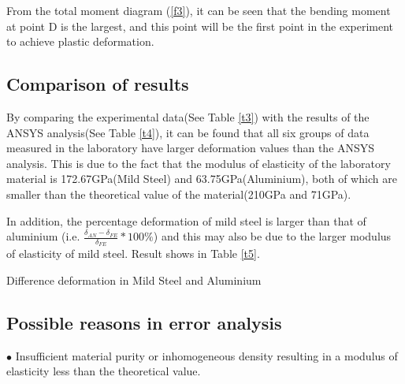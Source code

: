 From the total moment diagram (\autoref{f3}), it can be seen that the bending moment at point D is the largest, and this point will be the first point in the experiment to achieve plastic deformation.






\iffalse
\subsection*{Comparison of results}

By comparing the experimental data(See Table \ref{t3}) with the results of the ANSYS analysis(See Table \ref{t4}), 
it can be found that all six groups of data measured in the laboratory have 
larger deformation values than the ANSYS analysis. This is due to the fact 
that the modulus of elasticity of the laboratory material is 172.67GPa(Mild Steel) and 63.75GPa(Aluminium), 
both of which are smaller than the theoretical value of the material(210GPa and 71GPa).


In addition, the percentage deformation of mild steel is larger than 
that of aluminium 
(i.e. $\frac{\delta_{AN}-\delta_{FE}}{\delta_{FE}}*100\%$)
and this may also be due to the larger modulus of elasticity of mild steel.
Result shows in Table \ref{t5}.

\begin{minipage}[htbp]{\textwidth}
    \makeatletter{}
    \centering

    \caption{Difference deformation in Mild Steel and Aluminium}
    \label{t5} 
\end{minipage}






\subsection*{Possible reasons in error analysis}
$\bullet$ Insufficient material purity or inhomogeneous density 
resulting in a modulus of elasticity less than the theoretical value.

